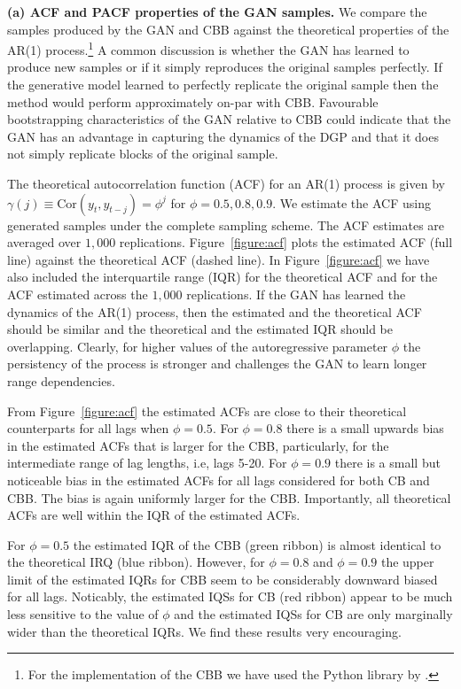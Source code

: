 \documentclass[12pt]{article}
\begin{document}
\textbf{(a) ACF and PACF properties of the GAN samples.} We compare the samples produced by the GAN and CBB against the theoretical properties of the AR(1) process.\footnote{For the implementation of the CBB we have used the Python library by \citet{Sheppard2020}.} 
A common discussion is whether the GAN has learned to produce new samples or if it simply reproduces the original samples perfectly. If the generative model learned to perfectly replicate the original sample then the method would perform approximately on-par with CBB. Favourable bootstrapping characteristics of the GAN relative to CBB could indicate that the GAN has an advantage in capturing the dynamics of the DGP and that it does not simply replicate blocks of the original sample.

The theoretical autocorrelation function (ACF) for an AR(1) process is given by $\gamma(j) \equiv \text{Cor}(y_t, y_{t-j}) = \phi^j$ for $\phi = 0.5, 0.8, 0.9$. We estimate the ACF using generated samples under the complete sampling scheme. The ACF estimates are averaged over $1,000$ replications. Figure~\ref{figure:acf} plots the estimated ACF (full line) against the theoretical ACF (dashed line). In Figure~\ref{figure:acf} we have also included the interquartile range (IQR) for the theoretical ACF and for the ACF estimated across the $1,000$ replications. If the GAN has learned the dynamics of the AR(1) process, then the estimated and the theoretical ACF should be similar and the theoretical and the estimated IQR should be overlapping. Clearly, for higher values of the autoregressive parameter $\phi$ the persistency of the process is stronger and challenges the GAN to learn longer range dependencies.

From Figure~\ref{figure:acf} the estimated ACFs are close to their theoretical counterparts for all lags when $\phi = 0.5$. For $\phi = 0.8$ there is a small upwards bias in the estimated ACFs that is larger for the CBB, particularly, for the intermediate range of lag lengths, i.e, lags 5-20.  For $\phi = 0.9$ there is a small but noticeable bias in the estimated ACFs for all lags considered for both CB and CBB. The bias is again uniformly larger for the CBB. Importantly, all theoretical ACFs are well within the IQR of the estimated ACFs. 

For $\phi = 0.5$ the estimated IQR of the CBB (green ribbon) is almost identical to the theoretical IRQ (blue ribbon). However, for $\phi = 0.8$ and $\phi = 0.9$ the upper limit of the estimated IQRs for CBB seem to be considerably downward biased for all lags. Noticably, the estimated IQSs for CB (red ribbon) appear to be much less sensitive to the value of $\phi$ and the estimated IQSs for CB are only marginally wider than the theoretical IQRs. We find these results very encouraging.
\end{document}
